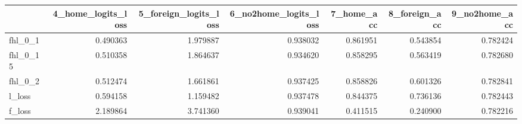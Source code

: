 \begin{tabular}{lrrrrrr}
\toprule
 & 4_home_logits_loss & 5_foreign_logits_loss & 6_no2home_logits_loss & 7_home_acc & 8_foreign_acc & 9_no2home_acc \\
\midrule
fhl_0_1 & 0.490363 & 1.979887 & 0.938032 & 0.861951 & 0.543854 & 0.782424 \\
fhl_0_15 & 0.510358 & 1.864637 & 0.934620 & 0.858295 & 0.563419 & 0.782680 \\
fhl_0_2 & 0.512474 & 1.661861 & 0.937425 & 0.858826 & 0.601326 & 0.782841 \\
l_loss & 0.594158 & 1.159482 & 0.937478 & 0.844375 & 0.736136 & 0.782443 \\
f_loss & 2.189864 & 3.741360 & 0.939041 & 0.411515 & 0.240900 & 0.782216 \\
\bottomrule
\end{tabular}
